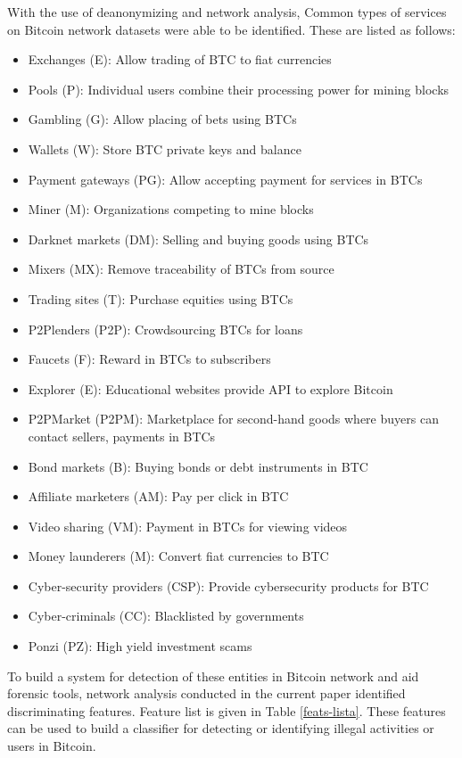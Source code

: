 \documentclass[preprint,12pt]{elsarticle}
\begin{document}
With the use of deanonymizing and network analysis, Common types of services on Bitcoin network datasets were able to be identified. These are listed as follows:

\begin{itemize}
    \item Exchanges (E): Allow trading of BTC to fiat currencies 
    \item Pools (P): Individual users combine their processing power for mining blocks
    \item Gambling (G): Allow placing of bets using BTCs
    \item Wallets (W): Store BTC private keys and balance
    \item Payment gateways (PG): Allow accepting payment for services in BTCs
    \item Miner (M): Organizations competing to mine blocks
    \item Darknet markets (DM): Selling and buying goods using BTCs
    \item Mixers (MX):  Remove traceability of BTCs from source
    \item Trading sites (T): Purchase equities using BTCs
    \item P2Plenders (P2P): Crowdsourcing BTCs for loans
    \item Faucets (F): Reward in BTCs to subscribers
    \item Explorer (E): Educational websites provide API to explore Bitcoin
    \item P2PMarket (P2PM): Marketplace for second-hand goods where buyers can contact sellers, payments in BTCs
    \item Bond markets (B): Buying bonds or debt instruments in BTC
    \item Affiliate marketers (AM): Pay per click in BTC
    \item Video sharing (VM): Payment in BTCs for viewing videos
    \item Money launderers (M): Convert fiat currencies to BTC 
    \item Cyber-security providers (CSP): Provide cybersecurity products for BTC
    \item Cyber-criminals (CC): Blacklisted by governments
    \item Ponzi (PZ): High yield investment scams
\end{itemize}



To build a system for detection of these entities in Bitcoin network and aid forensic tools, network analysis conducted in the current paper identified discriminating features. Feature list is given in Table \ref{feats-lista}. These features can be used to build a classifier for detecting or identifying illegal activities or users in Bitcoin.
\end{document}
